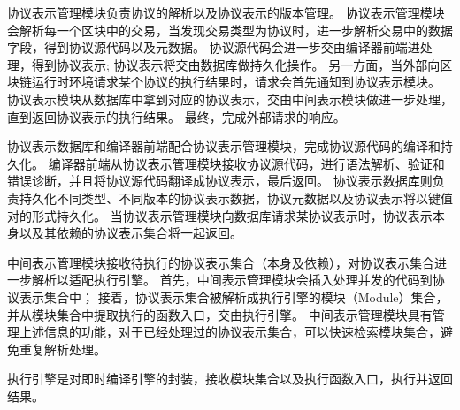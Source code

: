 协议表示管理模块负责协议的解析以及协议表示的版本管理。
协议表示管理模块会解析每一个区块中的交易，当发现交易类型为协议时，进一步解析交易中的数据字段，得到协议源代码以及元数据。
协议源代码会进一步交由编译器前端进处理，得到协议表示;
协议表示将交由数据库做持久化操作。
另一方面，当外部向区块链运行时环境请求某个协议的执行结果时，请求会首先通知到协议表示模块。
协议表示模块从数据库中拿到对应的协议表示，交由中间表示模块做进一步处理，直到返回协议表示的执行结果。
最终，完成外部请求的响应。

协议表示数据库和编译器前端配合协议表示管理模块，完成协议源代码的编译和持久化。
编译器前端从协议表示管理模块接收协议源代码，进行语法解析、验证和错误诊断，并且将协议源代码翻译成协议表示，最后返回。
协议表示数据库则负责持久化不同类型、不同版本的协议表示数据，协议元数据以及协议表示将以键值对的形式持久化。
当协议表示管理模块向数据库请求某协议表示时，协议表示本身以及其依赖的协议表示集合将一起返回。

中间表示管理模块接收待执行的协议表示集合（本身及依赖），对协议表示集合进一步解析以适配执行引擎。
首先，中间表示管理模块会插入处理并发的代码到协议表示集合中；
接着，协议表示集合被解析成执行引擎的模块（Module）集合，并从模块集合中提取执行的函数入口，交由执行引擎。
中间表示管理模块具有管理上述信息的功能，对于已经处理过的协议表示集合，可以快速检索模块集合，避免重复解析处理。

执行引擎是对即时编译引擎的封装，接收模块集合以及执行函数入口，执行并返回结果。

